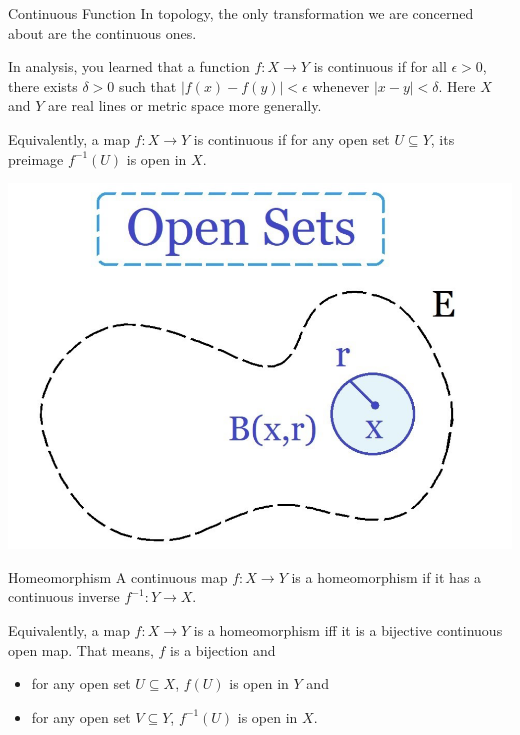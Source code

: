 \documentclass[handout, aspectratio=169]{beamer}
\begin{document}
\begin{frame}{Continuous Function}
    In topology, the only transformation we are concerned about are the continuous ones.

    In analysis, you learned that a function $f:X\rightarrow Y$ is continuous if for all $\epsilon>0$, there exists $\delta>0$ such that $|f(x)-f(y)|<\epsilon$ whenever $|x-y|<\delta$. Here $X$ and $Y$ are real lines or metric space more generally.

    Equivalently, a map $f:X\rightarrow Y$ is continuous if for any open set $U\subseteq Y$, its preimage $f^{-1}(U)$ is open in $X$.
\end{frame}
\begin{frame}{}
    \begin{center}
    \includegraphics[scale=.5]{open set.png}
    \end{center}
\end{frame}

\begin{frame}{Homeomorphism}
    A continuous map $f: X\rightarrow Y$ is a homeomorphism if it has a continuous inverse $f^{-1}:Y\rightarrow X$.

    Equivalently, a map $f:X\rightarrow Y$ is a homeomorphism iff it is a bijective continuous open map. That means, $f$ is a bijection and
    \begin{itemize}
        \item for any open set $U\subseteq X$, $f(U)$ is open in $Y$ and 
        \item for any open set $V\subseteq Y$, $f^{-1}(U)$ is open in $X$.
    \end{itemize}
\end{frame}
\end{document}
